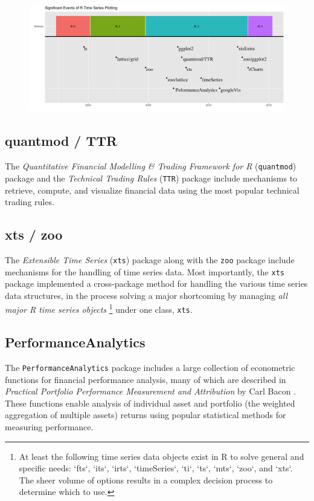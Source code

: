\begin{figure}[htbp]
  \centering
  \includegraphics[width=13cm]{img/timeline}
  \timeline
\end{figure}

\subsection{quantmod / TTR}\label{quantmod-ttr}

The \emph{Quantitative Financial Modelling \& Trading Framework for R}
(\texttt{quantmod}) package and the \emph{Technical Trading Rules}
(\texttt{TTR}) package include mechanisms to retrieve, compute, and
visualize financial data using the most popular technical trading rules.

\subsection{xts / zoo}\label{xts-zoo}

The \emph{Extensible Time Series} (\texttt{xts}) package along with the
\texttt{zoo} package include mechanisms for the handling of time series
data. Most importantly, the \texttt{xts} package implemented a
cross-package method for handling the various time series data
structures, in the process solving a major shortcoming by managing
\emph{all major R time series objects}
\footnote{At least the following time series data objects exist in R to solve general and specific needs: `fts`, `its`, `irts`, `timeSeries`, `ti`, `ts`, `mts`, `zoo`, and `xts`. The sheer volume of options results in a complex decision process to determine which to use.}
under one class, \texttt{xts}.

\subsection{PerformanceAnalytics}\label{performanceanalytics}

The \texttt{PerformanceAnalytics} package includes a large collection of
econometric functions for financial performance analysis, many of which
are described in \emph{Practical Portfolio Performance Measurement and
Attribution} by Carl Bacon \citep{Bacon2004}. These functions enable
analysis of individual asset and portfolio (the weighted aggregation of
multiple assets) returns using popular statistical methods for measuring
performance.

